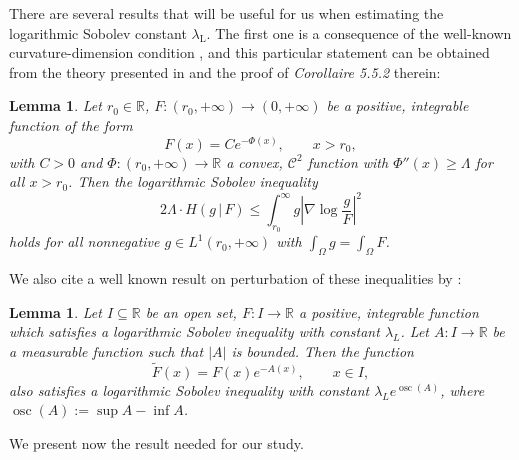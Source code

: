\documentclass[12pt,longbibliography]{article}
\def\R{\mathbb{R}}
\def\:{\colon}
\def\R{\mathbb{R}}
\def\:{\colon}
\def\lambdaL{\lambda_{\mathrm{L}}}
\newtheorem{lem}[thm]{Lemma}
\theoremstyle{definition}
\theoremstyle{remark}
\theoremstyle{example}
\begin{document}
There are several results that will be useful for us when estimating
the logarithmic Sobolev constant $\lambdaL$. The first one is a
consequence of the well-known curvature-dimension condition
\cite{Ane-Blachere-Chafa-Fougeres-Gentil-Malrieu-Roberto-Scheffer-2000,Bakry2014}, and this particular statement can be
obtained from the theory presented in \cite[Section 5]{Ane-Blachere-Chafa-Fougeres-Gentil-Malrieu-Roberto-Scheffer-2000} and
the proof of \textit{Corollaire 5.5.2} therein:
\begin{lem}
	\label{lem:curvature-logsob}
	Let $r_0 \in\R$,  $F \: (r_0,+\infty) \to (0,+\infty)$ be a positive,
	integrable function of the form
	\begin{equation*}
		F(x) = C e^{-\Phi(x)},
		\qquad x > r_0,
	\end{equation*}
	with $C > 0$ and $\Phi \: (r_0,+\infty) \to \R$ a convex,
	$\mathcal{C}^2$ function with $\Phi''(x) \geq \Lambda$ for all $x >
	r_0$. Then the logarithmic Sobolev inequality
	\begin{equation*}
		2 \Lambda\cdot H(g \,|\, F)
		\leq \int_{r_0}^\infty g \left| \nabla  \log\frac{g}{F} \right|^2
	\end{equation*}
	holds for all nonnegative $g \in L^1(r_0,+\infty)$ with $\int_\Omega g = \int_\Omega F$.
\end{lem}

We also cite a well known result on perturbation of these
inequalities by \cite{Holley1987}:
\begin{lem}
	\label{lem:HolleyStroock}
	Let $I \subseteq \R$ be an open set, $F \: I \to \R$ a
	positive, integrable function which satisfies a logarithmic Sobolev
	inequality with constant $\lambda_L$. Let $A \: I \to \R$ be a
	measurable function such that $|A|$ is bounded. Then the function
	\begin{equation*}
		\widetilde{F}(x) = F(x) e^{-A(x)}, \qquad x \in I,
	\end{equation*}
	also satisfies a logarithmic Sobolev inequality with constant
	$\lambda_L e^{\operatorname{osc}(A)}$, where
	$\operatorname{osc}(A) := \sup A - \inf A$.
\end{lem}

We present now the result needed for our study.
\end{document}

